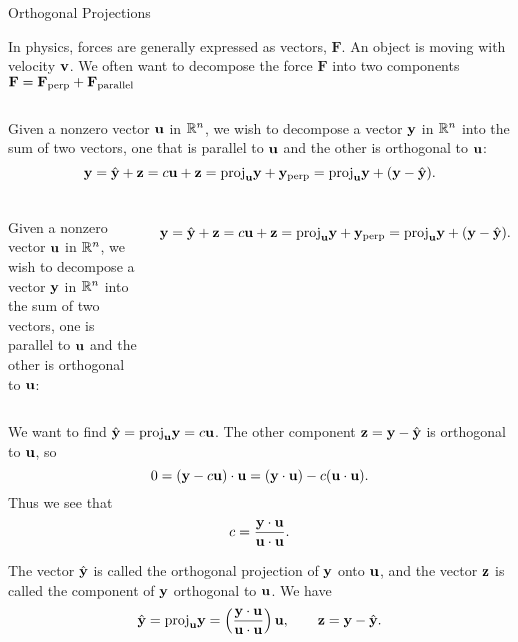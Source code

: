 \documentclass[xcolor=dvipsnames,aspectratio=169,t]{beamer}
\begin{document}
\begin{frame}{Orthogonal Projections}
  \bigskip

  \bi
  \ii In physics, forces are generally expressed as vectors, $\mathbf{F}$.
  \ii An object is moving with velocity $\mathbf{v}$.
  \ii We often want to decompose the force $\mathbf{F}$ into two components $\mathbf{F} = \mathbf{F}_{\rm perp} + \mathbf{F}_{\rm parallel}$
  \ei
  \vspace*{1.5em}

  \begin{columns}[T]

  \column{0.7\tw}

  Given a nonzero vector $\mathbf{u}$ in $\mathbb{R}^n$, we wish to decompose a vector $\mathbf{y}$ in $\mathbb{R}^n$ into the sum of two vectors, one that is \alert{parallel} to $\mathbf{u}$ and the other is \alert{orthogonal} to $\mathbf{u}$:
  \[ \mathbf{y} = \hat{\mathbf{y}} + \mathbf{z} = c \mathbf{u} + \mathbf{z} =  \mbox{proj}_{\mathbf{u}} \mathbf{y} + \mathbf{y}_{\rm perp} = \mbox{proj}_{\mathbf{u}} \mathbf{y} + (\mathbf{y} - \hat{\mathbf{y}}) .\]

  \column{0.3\tw}
  \hspace*{-1em}
  
  \end{columns}
\end{frame}


\begin{frame}
  \vspace*{-.7em}

  \begin{columns}[T]
  \column{0.7\tw}
  Given a nonzero vector $\mathbf{u}$ in $\mathbb{R}^n$, we wish to decompose a vector $\mathbf{y}$ in $\mathbb{R}^n$ into the sum of two vectors, one is parallel to $\mathbf{u}$ and the other is orthogonal to $\mathbf{u}$:
  \vspace*{-2em}
  
  \[ \mathbf{y} = \hat{\mathbf{y}} + \mathbf{z} = c \mathbf{u} + \mathbf{z} =  \mbox{proj}_{\mathbf{u}} \mathbf{y} + \mathbf{y}_{\rm perp} = \mbox{proj}_{\mathbf{u}} \mathbf{y} + (\mathbf{y} - \hat{\mathbf{y}}) .\]

  \column{0.3\tw}
  \hspace*{2em}\scalebox{.6}{}
  \end{columns}
  \medskip

  We want to find $\hat{\mathbf{y}} = \mbox{proj}_{\mathbf{u}} \mathbf{y}= c\mathbf{u}$. 
  \pause
  The other component $\mathbf{z} = \mathbf{y} - \hat{\mathbf{y}}$ is \alert{orthogonal} to $\mathbf{u}$, so
  \[ 0 = (\mathbf{y} - c\mathbf{u}) \cdot \mathbf{u} = (\mathbf{y} \cdot \mathbf{u}) - c( \mathbf{u} \cdot \mathbf{u}) .\]
  \pause
  Thus we see that 
  \[ c = \frac{\mathbf{y} \cdot \mathbf{u}}{\mathbf{u} \cdot \mathbf{u}}. \]

  \pause
  \begin{definition}
    The vector $\hat{\mathbf{y}}$ is called the \alert{orthogonal projection of $\mathbf{y}$ onto $\mathbf{u}$}, and the vector $\mathbf{z}$ is called the \alert{component of $\mathbf{y}$ orthogonal to $\mathbf{u}$}. We have 
    \[ \hat{\mathbf{y}} =  \mbox{proj}_{\mathbf{u}} \mathbf{y} =  \left( \frac{\mathbf{y} \cdot \mathbf{u}}{\mathbf{u} \cdot \mathbf{u}} \right) \mathbf{u}, \qquad \mathbf{z} = \mathbf{y} - \hat{\mathbf{y}}.\]
  \end{definition}
\end{frame}
\end{document}
